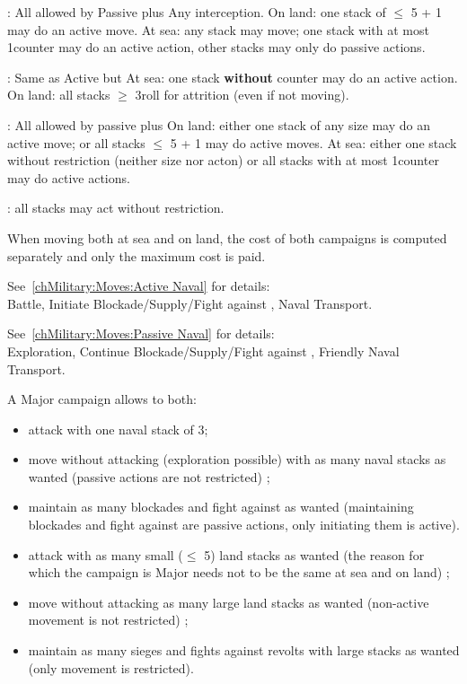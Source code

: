 \ducats: All allowed by Passive plus
\bparag Any interception.
\bparag On land: one stack of $\leq$ 5 \LD + 1 \Pasha may do an active move.
\bparag At sea: any stack may move; one stack with at most 1\FLEET counter
may do an active action, other stacks may only do passive actions.

\ducats: Same as Active but
\bparag At sea: one stack \textbf{without} \FLEET counter may do an active
action.
\bparag On land: all stacks $\geq$ 3\LD roll for attrition (even if not
moving).

\ducats: All allowed by passive plus
\bparag On land: either one stack of any size may do an active move;
or all stacks $\leq$ 5 \LD + 1 \Pasha may do active moves.
\bparag At sea: either one stack without restriction (neither size nor acton)
or all stacks with at most 1\FLEET counter may do active actions.

\ducats: all stacks may act without restriction.

\aparag When moving both at sea and on land, the cost of both campaigns is
computed separately and only the maximum cost is paid.

 See~\ref{chMilitary:Moves:Active Naval}
for details:\\
Battle, Initiate Blockade/Supply/Fight against \corsaire, Naval Transport.

 See~\ref{chMilitary:Moves:Passive Naval}
for details:\\
Exploration, Continue Blockade/Supply/Fight against \corsaire, Friendly Naval
Transport.

\begin{exemple}
  A Major campaign allows to both:
  \begin{itemize}
  \item attack with one naval stack of 3\FLEET ;
  \item move without attacking (exploration possible) with as many naval
    stacks as wanted (passive actions are not restricted) ;
  \item maintain as many blockades and fight against \corsaire as wanted
    (maintaining blockades and fight against \corsaire are passive actions,
    only initiating them is active).
  \item attack with as many small ($\leq$ 5\LD) land stacks as wanted (the
    reason for which the campaign is Major needs not to be the same at sea and
    on land) ;
  \item move without attacking as many large land stacks as wanted
    (non-active movement is not restricted) ;
  \item maintain as many sieges and fights against revolts with large stacks as
    wanted (only movement is restricted).
  \end{itemize}
\end{exemple}

